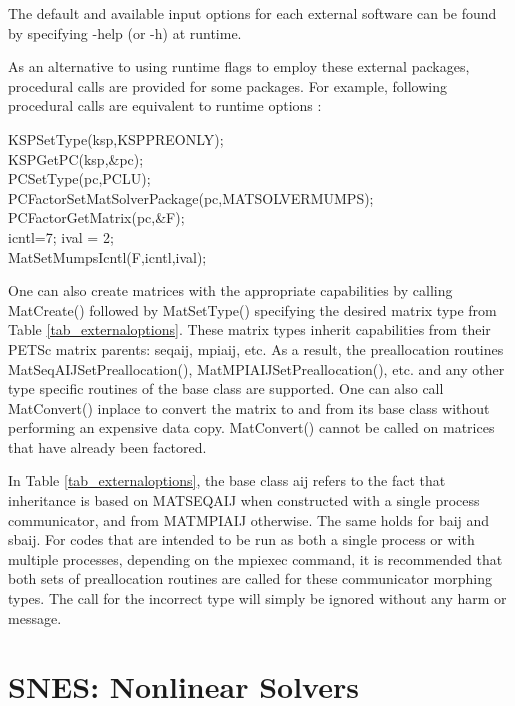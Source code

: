 The default and available input options for each external software can be found
by specifying -help (or -h) at runtime.

As an alternative to using runtime flags to employ these external
packages, 
procedural calls are provided for some packages. For example, following procedural calls
are equivalent to runtime options
   :
\begin{tabbing}
KSPSetType(ksp,KSPPREONLY);\\
KSPGetPC(ksp,\&pc);\\
PCSetType(pc,PCLU);\\
PCFactorSetMatSolverPackage(pc,MATSOLVERMUMPS);\\
PCFactorGetMatrix(pc,\&F);\\
icntl=7; ival = 2;\\
MatSetMumpsIcntl(F,icntl,ival);
\end{tabbing}

One can also create matrices with the appropriate
capabilities by calling MatCreate() followed by MatSetType()
specifying the desired matrix type from Table \ref{tab_externaloptions}.
These matrix types inherit capabilities from their PETSc matrix
parents: seqaij, mpiaij, etc.  As a result, the preallocation routines
MatSeqAIJSetPreallocation(), MatMPIAIJSetPreallocation(), etc. and any other type
specific routines of the base class are supported.  One can also
call MatConvert() inplace to convert the matrix to and from its base
class without performing an expensive data copy.  MatConvert() cannot be
called on matrices that have already been factored.

In Table \ref{tab_externaloptions}, the base class aij refers to the fact
that inheritance is based on MATSEQAIJ when constructed with a single
process communicator, and from MATMPIAIJ otherwise.  The same holds
for baij and sbaij.  For codes that are intended to be run as both a
single process or with multiple processes, depending on the mpiexec
command, it is recommended that both sets of preallocation routines
are called for these communicator morphing types.  The call for the
incorrect type will simply be ignored without any harm or message.


\cleardoublepage
\chapter{SNES: Nonlinear Solvers}
\label{chapter_snes}

